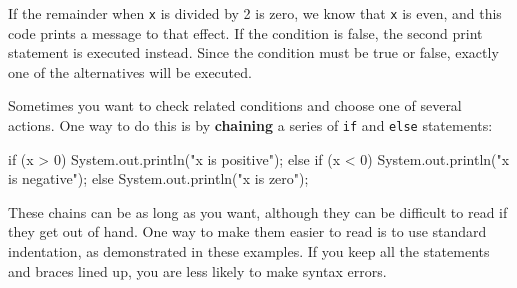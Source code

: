 \documentclass[12pt]{book}
\theoremstyle{exercise}
\newcommand{\java}[1]{\verb"#1"}
\newcommand{\java}[1]{\lstinline{#1}} %
\begin{document}
If the remainder when \java{x} is divided by 2 is zero, we know that \java{x} is even, and this code prints a message to that effect.
If the condition is false, the second print statement is executed instead.
Since the condition must be true or false, exactly one of the alternatives will be executed.

%
%
%
%
%
%


Sometimes you want to check related conditions and choose one of several actions.
One way to do this is by {\bf chaining} a series of \java{if} and \java{else} statements:

\begin{code}
    if (x > 0) {
        System.out.println("x is positive");
    } else if (x < 0) {
        System.out.println("x is negative");
    } else {
        System.out.println("x is zero");
    }
\end{code}

These chains can be as long as you want, although they can be difficult to read if they get out of hand.
One way to make them easier to read is to use standard indentation, as demonstrated in these examples.
If you keep all the statements and braces lined up, you are less likely to make syntax errors.

\end{document}
